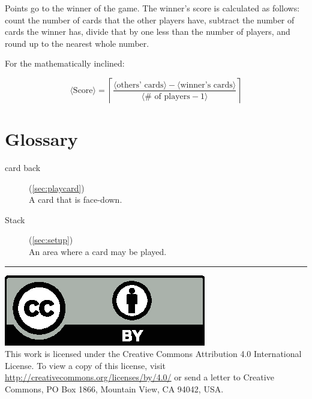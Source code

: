 \documentclass{article}
\begin{document}
Points go to the winner of the game. The winner's score is calculated as follows: count the number of cards that the other players have, subtract the number of cards the winner has, divide that by one less than the number of players, and round up to the nearest whole number.

For the mathematically inclined:

$$
\langle\textrm{Score}\rangle = \left\lceil\frac{\langle\textrm{others'\ cards}\rangle - \langle\textrm{winner's\ cards}\rangle}{\langle\textrm{\#\ of\ players} - 1\rangle}\right\rceil
$$

\section{Glossary}
\begin{description}
  \item[card back] (\autoref{sec:playcard})\\
    A card that is face-down.
  \item[Stack] (\autoref{sec:setup})\\
    An area where a card may be played.
\end{description}

\medskip
\hrule

{
  \small
  \includegraphics[scale=0.5]{cc-by.eps}\\
  This work is licensed under the Creative Commons Attribution 4.0
  International License. To view a copy of this license, visit
  \url{http://creativecommons.org/licenses/by/4.0/} or send a letter to Creative Commons, PO Box 1866, Mountain View, CA 94042, USA.
}
\end{document}
